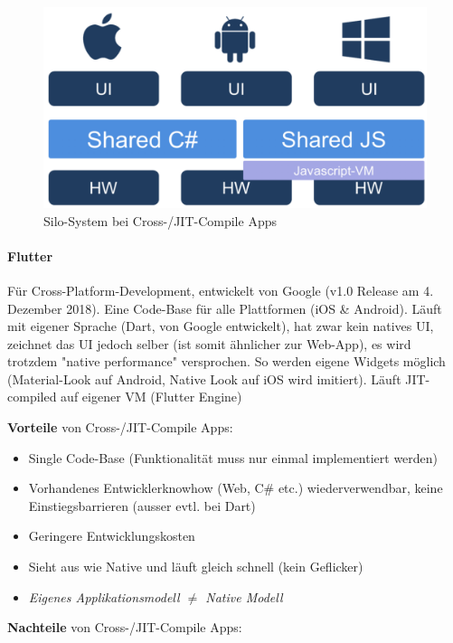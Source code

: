 \documentclass[a4paper]{article}
\begin{document}
{\begin{itemize}
	\end{itemize}

	\begin{figure}[!htb]
		\centering
		\includegraphics[width=.4\textwidth]{img/android8/jit_silo.png}
		\caption{Silo-System bei Cross-/JIT-Compile Apps}
		\label{fig:cross_jit_silo}
	\end{figure}

	\paragraph{Flutter} Für Cross-Platform-Development, entwickelt von Google (v1.0 Release am 4. Dezember 2018). Eine Code-Base für alle Plattformen (iOS \& Android). Läuft mit eigener Sprache (Dart, von Google entwickelt), hat zwar kein natives UI, zeichnet das UI jedoch selber (ist somit ähnlicher zur Web-App), es wird trotzdem "native performance" versprochen. So werden eigene Widgets möglich (Material-Look auf Android, Native Look auf iOS wird imitiert). Läuft JIT-compiled auf eigener VM (Flutter Engine)
	
	\newpage
	\noindent
	\textbf{Vorteile} von Cross-/JIT-Compile Apps:
	\begin{itemize}
		
		\item Single Code-Base (Funktionalität muss nur einmal implementiert werden)
		
		\item Vorhandenes Entwicklerknowhow (Web, C\# etc.) wiederverwendbar, keine Einstiegsbarrieren (ausser evtl. bei Dart)
		
		\item Geringere Entwicklungskosten
		
		\item Sieht aus wie Native und läuft gleich schnell (kein Geflicker)
		
		\item \textit{Eigenes Applikationsmodell $\neq$ Native Modell}
		
	\end{itemize}
	\vspace{1em}
	\textbf{Nachteile} von Cross-/JIT-Compile Apps:
	\begin{itemize}
		

\end{itemize}}
\end{document}
